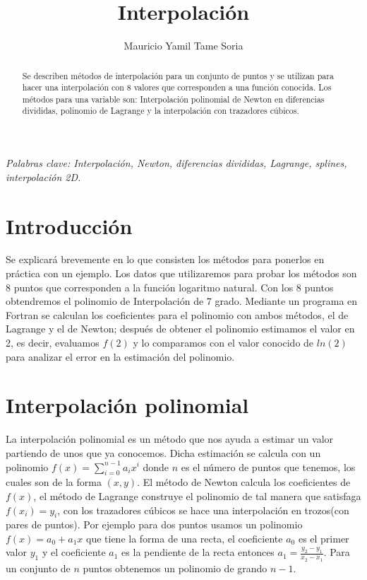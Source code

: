 \documentclass[10pt,twocolumn]{article}
\begin{document}
\title{Interpolaci\'on}
\author{Mauricio Yamil Tame Soria}
\maketitle

\begin{abstract}
Se describen m\'etodos de interpolaci\'on para un conjunto de puntos y se utilizan para hacer una 
interpolaci\'on con 8 valores que corresponden a una funci\'on conocida. Los m\'etodos para una 
variable son:   
Interpolaci\'on polinomial de Newton en diferencias divididas, polinomio 
de Lagrange y la interpolaci\'on con trazadores c\'ubicos.
\end{abstract}

\emph{Palabras clave: Interpolaci\'on, Newton, diferencias divididas, 
Lagrange, splines, interpolaci\'on 2D.}

\section{Introducci\'on}
Se explicar\'a brevemente en lo que consisten los m\'etodos para ponerlos en pr\'actica con un ejemplo.
Los datos que utilizaremos para probar los m\'etodos son 8 puntos que corresponden a la funci\'on 
logaritmo natural. Con los 8 puntos obtendremos el polinomio de Interpolaci\'on de $7$ grado. Mediante 
un programa en Fortran se calculan los coeficientes para el polinomio con ambos m\'etodos, el de Lagrange 
y el 
de 
Newton; despu\'es de obtener el polinomio estimamos el valor en 2, es decir, evaluamos $f(2)$ y lo 
comparamos con el valor conocido de $ln(2)$ para analizar el error en la estimaci\'on del polinomio.  

\section{Interpolaci\'on polinomial}
La interpolaci\'on polinomial es un m\'etodo que nos ayuda a estimar un valor partiendo de unos que ya 
conocemos. Dicha estimaci\'on se calcula con un polinomio $f(x)= \sum_{i=0}^{n-1} a_ix^{i}$ donde $n$ es 
el 
n\'umero de puntos que tenemos, los cuales son de la forma $(x,y)$. El m\'etodo de Newton calcula los 
coeficientes de $f(x)$, el m\'etodo de Lagrange construye el polinomio de tal 
manera que satisfaga $f(x_i)=y_i$, con los trazadores c\'ubicos se hace una interpolaci\'on en trozos(con 
pares de puntos).
Por ejemplo 
para dos puntos usamos un 
polinomio $f(x)=a_0 + a_1x$ que tiene la forma de una recta, el coeficiente $a_0$ es el 
primer valor 
$y_1$ y el coeficiente $a_1$ es la pendiente de la recta entonces $a_1=\frac{y_2-y_1}{x_2-x_1}$. Para un 
conjunto de $n$ puntos obtenemos un polinomio de grando $n-1$.
\end{document}
